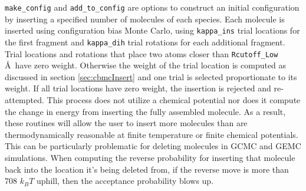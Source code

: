 {\tt make\_config} and {\tt add\_to\_config} are options to construct an initial configuration 
by inserting a specified number of molecules of each species.
Each molecule is inserted using configuration bias Monte Carlo, 
using {\tt kappa\_ins} trial locations for the first fragment and 
{\tt kappa\_dih} trial rotations for each additional fragment.
Trial locations and rotations that place two atoms closer than {\tt Rcutoff\_Low} \AA\ have zero weight.
Otherwise the weight of the trial location is computed as discussed in section \ref{sec:cbmcInsert} and 
one trial is selected proportionate to its weight.
If all trial locations have zero weight, the insertion is rejected and re-attempted.
This process does not utilize a chemical potential 
nor does it compute the change in energy from inserting the fully assembled molecule.
As a result, these routines will allow the user to insert more molecules than
are thermodynamically reasonable at finite temperature or finite chemical potentials.
This can be particularly problematic for deleting molecules in GCMC and GEMC simulations.
When computing the reverse probability for inserting that molecule back into the location it's being deleted from,
if the reverse move is more than 708 $k_BT$ uphill, then the acceptance probability blows up. \\
%
